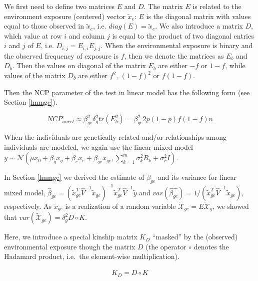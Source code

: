 \documentclass[]{book}
\begin{document}
We first need to define two matrices \(E\) and \(D\). The matrix \(E\)
is related to the environment exposure (centered) vector
\(\tilde{x}_e\): \(E\) is the diagonal matrix with values equal to those
observed in \(\tilde{x}_e\), i.e. \(diag(E) = \tilde{x}_e\). We also
introduce a matrix \(D\), which value at row \(i\) and column \(j\) is
equal to the product of two diagonal entries \(i\) and \(j\) of \(E\),
i.e. \(D_{i,j} = E_{i,i} E_{j,j}\). When the environmental exposure is
binary and the observed frequency of exposure is \(f\), then we denote
the matrices as \(E_b\) and \(D_b\). Then the values on diagonal of the
matrix \(E_b\) are either \(-f\) or \(1 - f\), while values of the
matrix \(D_b\) are either \(f^2\), \((1 - f)^2\) or \(f (1 - f)\).

Then the NCP parameter of the test in linear model has the following
form (see Section \ref{lmmge}).

\begin{equation}
NCP_{unrel}^i \approx \beta_{ge}^2 \delta_g^2 tr(E_b^2) = \beta_{ge}^2 2 p (1 - p) f (1 - f) n 
\label{eq:ncpgeun}
\end{equation}

When the individuals are genetically related and/or relationships among
individuals are modeled, we again use the linear mixed model
\(y \sim \mathcal{N} (\mu x_0 + \beta_g x_g + \beta_e x_e + \beta_{ge} x_{ge}, \sum_{k=1}^{m}{\sigma_k^2 R_k} + \sigma_r^2 I)\).

In Section \ref{lmmge} we derived the estimate of \(\beta_{ge}\) and its
variance for linear mixed model,
\(\hat{\beta}_{ge} = \left(\tilde{x}_{ge}^T \hat{V}^{-1} \tilde{x}_{ge}\right)^{-1} \tilde{x}_{ge}^T \hat{V}^{-1} \tilde{y}\)
and
\(var(\hat{\beta_{ge}}) = 1 / (\tilde{x}_{ge}^T \hat{V}^{-1} \tilde{x}_{ge})\),
respectively. As \(\tilde{x}_{ge}\) is a realization of a random
variable \(\mathcal{\tilde{X}}_{ge} = E \mathcal{\tilde{X}}_{g}\), we
showed that \(var(\mathcal{\tilde{X}}_{ge}) = \delta_g^2 D \circ K\).

Here, we introduce a special kinship matrix \(K_{D}\) ``masked'' by the
(observed) environmental exposure though the matrix \(D\) (the operator
\(\circ\) denotes the Hadamard product, i.e.~the element-wise
multiplication).

\begin{equation}
\begin{split}
K_{D} =  D \circ K
\end{split}
\label{eq:kdmat}
\end{equation}
\end{document}
